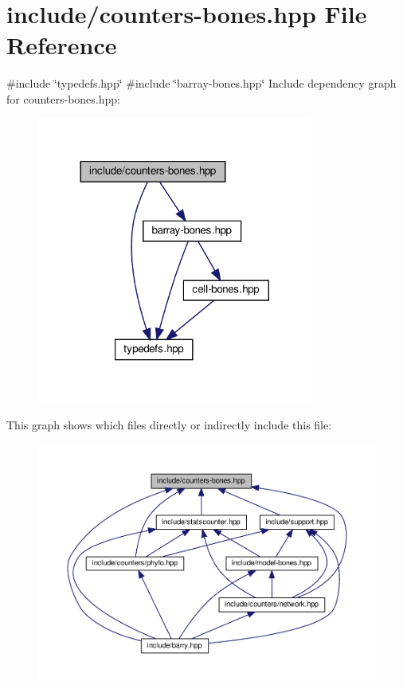 \hypertarget{counters-bones_8hpp}{}\section{include/counters-\/bones.hpp File Reference}
\label{counters-bones_8hpp}
{\ttfamily \#include \char`\"{}typedefs.\+hpp\char`\"{}}\newline
{\ttfamily \#include \char`\"{}barray-\/bones.\+hpp\char`\"{}}\newline
Include dependency graph for counters-\/bones.hpp\+:\nopagebreak
\begin{figure}[H]
\begin{center}
\leavevmode
\includegraphics[width=257pt]{counters-bones_8hpp__incl}
\end{center}
\end{figure}
This graph shows which files directly or indirectly include this file\+:\nopagebreak
\begin{figure}[H]
\begin{center}
\leavevmode
\includegraphics[width=350pt]{counters-bones_8hpp__dep__incl}
\end{center}
\end{figure}

